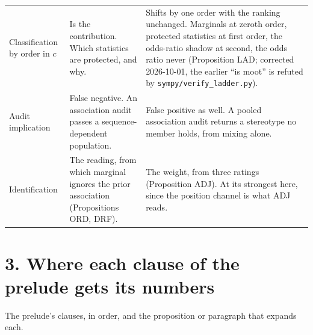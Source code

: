 \documentclass[11pt,a4paper]{article}
\begin{document}
\begin{longtable}{@{}L{3.0cm}L{6.5cm}L{6.5cm}@{}}
\addlinespace[3pt]
Classification by order in $c$ &
Is the contribution. Which statistics are protected, and why. &
Shifts by one order with the ranking unchanged. Marginals at zeroth order,
protected statistics at first order, the odds-ratio shadow at second, the odds
ratio never (Proposition LAD; corrected 2026-10-01, the earlier ``is moot'' is
refuted by \texttt{sympy/verify\_ladder.py}). \\
\addlinespace[3pt]
Audit implication &
False negative. An association audit passes a sequence-dependent
population. &
False positive as well. A pooled association audit returns a stereotype no
member holds, from mixing alone. \\
\addlinespace[3pt]
Identification &
The reading, from which marginal ignores the prior association
(Propositions ORD, DRF). &
The weight, from three ratings (Proposition ADJ). At its strongest here,
since the position channel is what ADJ reads. \\
\bottomrule
\end{longtable}
\normalsize

\section*{3. Where each clause of the prelude gets its numbers}

\noindent The prelude's clauses, in order, and the proposition or paragraph
that expands each.
\end{document}
